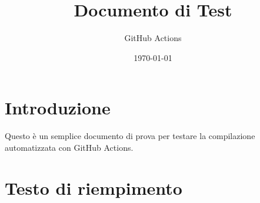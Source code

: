 \documentclass{article}
\begin{document}
\title{Documento di Test}
\author{GitHub Actions}
\date{\today}

\maketitle

\section{Introduzione}
Questo è un semplice documento di prova per testare la compilazione automatizzata con GitHub Actions.

\section{Testo di riempimento}
\lipsum[1-3]
\end{document}
